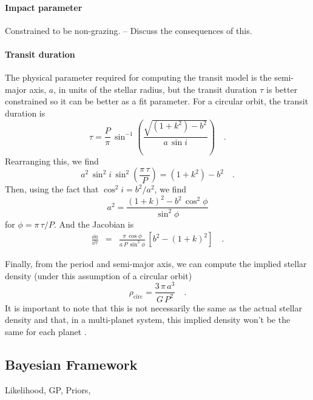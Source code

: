 \documentclass[modern]{aastex63}
\begin{document}
\paragraph{Impact parameter}
Constrained to be non-grazing. -- Discuss the consequences of this.

\paragraph{Transit duration}
The physical parameter required for computing the transit model is the semi-major axis, $a$, in units of the stellar radius, but the transit duration $\tau$ is better constrained so it can be better as a fit parameter.
For a circular orbit, the transit duration is \citep{Winn:2010}
\begin{equation}
  \tau = \frac{P}{\pi}\,\sin^{-1}\left( \frac{\sqrt{(1 + k^2) - b^2}}{a\,\sin i} \right) \quad.
\end{equation}
Rearranging this, we find
\begin{equation}
  a^2\,\sin^2 i\,\sin^2\left(\frac{\pi\,\tau}{P}\right) = (1 + k^2) - b^2 \quad.
\end{equation}
Then, using the fact that $\cos^2 i = b^2 / a^2$, we find
\begin{equation}
  a^2 = \frac{(1 + k)^2 - b^2\,\cos^2\phi}{\sin^2\phi}
\end{equation}
for $\phi = \pi\,\tau / P$.
And the Jacobian is
\begin{eqnarray}
  \frac{\dd a}{\dd \tau} &=& \frac{\pi\,\cos \phi}{a\,P\,\sin^3 \phi}\,\left[b^2 - (1 + k)^2\right] \quad.
\end{eqnarray}

Finally, from the period and semi-major axis, we can compute the implied stellar density (under this assumption of a circular orbit)
\begin{equation}
  \rho_\mathrm{circ} = \frac{3\,\pi\,a^3}{G\,P^2} \quad.
\end{equation}
It is important to note that this is not necessarily the same as the actual stellar density and that, in a multi-planet system, this implied density won't be the same for each planet \citep[see, for example,][]{Dawson:2012, Kipping:2012}.




\subsection{Bayesian Framework}


Likelihood, GP, Priors, \celerite
\end{document}
